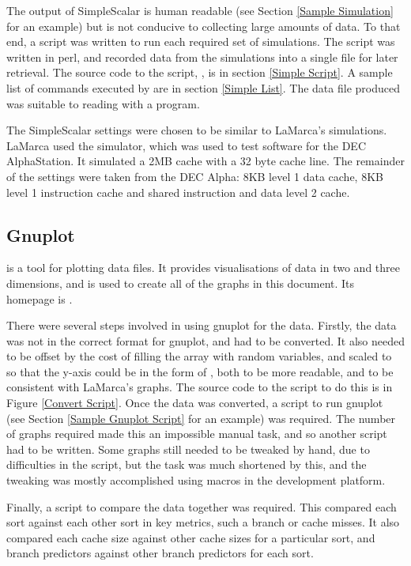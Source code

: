 The output of SimpleScalar is human readable (see Section \ref{Sample
Simulation} for an example) but is not conducive to collecting large amounts of
data. To that end, a script was written to run each required set of simulations. The
script was written in perl, and recorded data from the simulations into a single
file for later retrieval. The source code to the script, , is in
section \ref{Simple Script}.  A sample list of commands executed by  are
in section \ref{Simple List}. The data file produced was suitable to reading
with a  program.

The SimpleScalar settings were chosen to be similar to LaMarca's simulations.
LaMarca used the  simulator, which was used to test software for the DEC
AlphaStation. It simulated a 2MB cache with a 32 byte cache line. The remainder
of the settings were taken from the DEC Alpha: 8KB level 1 data cache, 8KB level
1 instruction cache and shared instruction and data level 2 cache. 

\subsection{Gnuplot}
\label{Gnuplot}
 is a tool for plotting data files. It provides visualisations of data in
two and three dimensions, and is used to create all of the graphs in this
document. Its homepage is .

There were several steps involved in using gnuplot for the data. Firstly, the
data was not in the correct format for gnuplot, and had to be converted. It also
needed to be offset by the cost of filling the array with random variables, and
scaled to so that the y-axis could be in the form of ,
both to be more readable, and to be consistent with LaMarca's graphs. The source
code to the script to do this is in Figure \ref{Convert Script}. Once the data
was converted, a script to run gnuplot (see Section \ref{Sample Gnuplot Script}
for an example) was required. The number of graphs required made this an
impossible manual task, and so another script had to be written.  Some graphs
still needed to be tweaked by hand, due to difficulties in the script, but the
task was much shortened by this, and the tweaking was mostly accomplished using
macros in the development platform.

Finally, a script to compare the data together was required.  This compared each
sort against each other sort in key metrics, such a branch or cache misses. It
also compared each cache size against other cache sizes for a particular sort,
and branch predictors against other branch predictors for each sort. 

